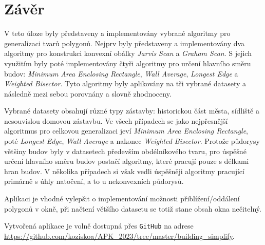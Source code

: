 \chapter*{Závěr}
\par V teto úloze byly představeny a implementovány vybrané algoritmy pro generalizaci tvarů polygonů. Nejprv byly představeny a implementovány dva algoritmy pro konstrukci konvexní obálky \emph{Jarvis Scan} a \emph{Graham Scan}. S jejich využitím byly poté implementovány čtyři algoritmy pro určení hlavního směru budov: \emph{Minimum Area Enclosing Rectangle}, \emph{Wall Average}, \emph{Longest Edge} a \emph{Weighted Bisector}. Tyto algoritmy byly aplikovány na tři vybrané datasety a následně mezi sebou porovnány a slovně zhodnoceny.

\par Vybrané datasety obsahují různé typy zástavby: historickou část města, sídliště a nesouvislou domovou zástavbu. Ve všech případech se jako nejpřesnější algoritmus pro celkovou generalizaci jeví \emph{Minimum Area Enclosing Rectangle}, poté \emph{Longest Edge}, \emph{Wall Average} a nakonec \emph{Weighted Bisector}. Protože půdorysy většiny budov byly v datasetech především obdélníkového tvaru, pro úspěšné určení hlavního směru budov postačí algoritmy, které pracují pouze s délkami hran budov. V několika případech si však vedli úspěšněji algoritmy pracující primárně s úhly natočení, a to u nekonvexních půdorysů.

\par Aplikaci je vhodné vylepšit o implementování možnosti přiblížení/oddálení polygonů v okně, při načtení většího datasetu se totiž stane obsah okna nečitelný. 

\par Vytvořená aplikace je volně dostupná přes \verb|GitHub| na adrese \url{https://github.com/koziskoa/APK_2023/tree/master/building_simplify}.